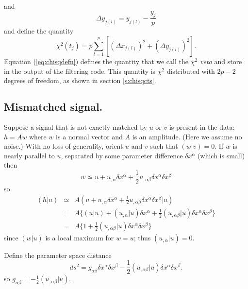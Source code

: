 and
\begin{equation}
\Delta y_{j(l)} = y_{j(l)} - \frac{y_j}{p}
\end{equation}
and define the quantity
\begin{equation}
\chi^2(t_j) = p \sum_{l = 1}^p \left[ \left(\Delta x_{j(l)}\right)^2 + \left(\Delta y_{j(l)}\right)^2 \right].
\label{eq:chisqdefn}
\end{equation}
Equation (\ref{eq:chisqdefn}) defines the quantity that we call the
\emph{$\chi^2$ veto} and store in the output of the filtering code.  This
quantity is $\chi^2$ distributed with $2p-2$ degrees of freedom, as shown in
section \ref{s:chisqcts}.

\subsection{Mismatched signal.}
\label{ss:mismatchedchisq}

Suppose a signal that is not exactly matched by $u$ or $v$ is present in
the data: $h=Aw$ where $w$ is a normal vector and $A$ is an amplitude.
(Here we assume no noise.)  With no loss of generality, orient $u$ and $v$
such that $(w|v)=0$.  If $w$ is nearly parallel to $u$, separated by some
parameter difference $\delta x^\alpha$ (which is small) then
\begin{equation}
  w \simeq u + u_{,\alpha}\delta x^\alpha 
  + {\textstyle{\frac{1}{2}}}u_{,\alpha\beta}\delta x^\alpha\delta x^\beta
\end{equation}
so
\begin{eqnarray}
  (h|u) &\simeq& A(u + u_{,\alpha}\delta x^\alpha 
  + {\textstyle{\frac{1}{2}}} u_{,\alpha\beta}\delta x^\alpha\delta x^\beta|u)
  \nonumber\\
  &=& A\bigl\{ (u|u) + (u_{,\alpha}|u)\delta x^\alpha
  + {\textstyle{\frac{1}{2}}} (u_{,\alpha\beta}|u)\delta x^\alpha\delta x^\beta
  \bigr\}\nonumber\\
  &=& A\bigl\{ 1 +
  {\textstyle{\frac{1}{2}}} (u_{,\alpha\beta}|u)\delta x^\alpha\delta x^\beta
  \bigr\}
\end{eqnarray}
since $(w|u)$ is a local maximum for $w=u$; thus $(u_{,\alpha}|u)=0$.

Define the parameter space distance
\begin{equation}
  ds^2 = g_{\alpha\beta}\delta x^\alpha\delta x^\beta
  - {\textstyle{\frac{1}{2}}} (u_{,\alpha\beta}|u)\delta x^\alpha\delta x^\beta.
\end{equation}
so $g_{\alpha\beta}=-{\textstyle{\frac{1}{2}}}(u_{,\alpha\beta}|u)$.

